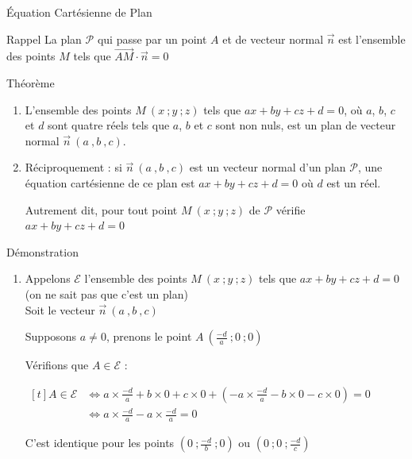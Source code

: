 \documentclass{coursbook}
\begin{document}
    \begin{Gpartie}{Équation Cartésienne de Plan} 
        \begin{Spartie}{Rappel} 
            La plan $\mathcal{P}$ qui passe par un point $A$ et de vecteur normal $\vec{n}$ est l'ensemble des points $M$ tels que $\overrightarrow{AM}\cdot\vec{n}=0$
        \end{Spartie}
        \begin{Spartie}{Théorème} 
            \begin{enumerate}[(1)]
                \item   L'ensemble des points $M~\left(x~;y~;z\right)$ tels que $ax+by+cz+d=0$, où $a$, $b$, $c$ et $d$ sont quatre réels tels que $a$, $b$ et $c$ sont non nuls, est un plan de vecteur normal $\vec{n}~\left(a~,b~,c\right)$.
                
                \item   Réciproquement : si $\vec{n}~\left(a~,b~,c\right)$ est un vecteur normal d'un plan $\mathcal{P}$, une équation cartésienne de ce plan est $ax+by+cz+d=0$ où $d$ est un réel.
                
                Autrement dit, pour tout point $M~\left(x~;y~;z\right)$ de $\mathcal{P}$ vérifie $ax+by+cz+d=0$
            \end{enumerate}
            \begin{SSpartie}{Démonstration} 
                \begin{enumerate}[(1)]
                    \item   Appelons $\mathcal{E}$ l'ensemble des points $M~\left(x~;y~;z\right)$ tels que $ax+by+cz+d=0$ (on ne sait pas que c'est un plan) \\ Soit le vecteur $\vec{n}~\left(a~,b~,c\right)$
                    
                    Supposons $a\neq 0$, prenons le point $A~\left(\frac{-d}{a}~;0~;0\right)$

                    Vérifions que $A\in\mathcal{E}$ :

                    $\begin{aligned}[t]
                        A\in\mathcal{E}&\iff a\times\tfrac{-d}{a}+b\times0+c\times0+\left(-a\times\tfrac{-d}{a}-b\times0-c\times0\right)=0 \\
                        &\iff a\times\tfrac{-d}{a}-a\times\tfrac{-d}{a}=0
                    \end{aligned}$

                    C'est identique pour les points $\left(0~;\frac{-d}{b}~;0\right)$ ou $\left(0~;0~;\frac{-d}{c}\right)$
                    

\end{enumerate}
\end{SSpartie}
\end{Spartie}
\end{Gpartie}
\end{document}
